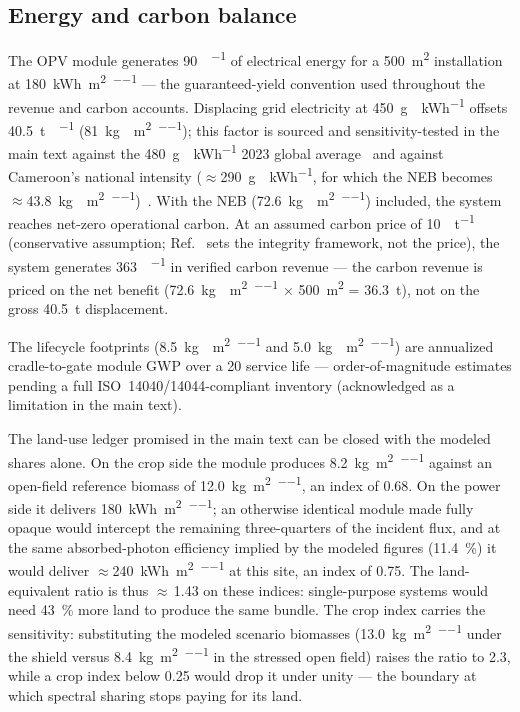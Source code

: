 \documentclass[11pt,a4paper]{article}
\begin{document}
\subsection{Energy and carbon balance}

The OPV module generates \qty{90}{\MWh\per\yr} of electrical energy for a \qty{500}{\m\squared} installation at \qty{180}{\kWh\per\m\squared\per\yr} --- the guaranteed-yield convention used throughout the revenue and carbon accounts. Displacing grid electricity at \qty{450}{\g{}\per\kWh} offsets \qty{40.5}{\tonne{}\per\yr} (\qty{81}{\kg{}\per\m\squared\per\yr}); this factor is sourced and sensitivity-tested in the main text against the \qty{480}{\g{}\per\kWh} 2023 global average~\cite{Ember2024} and against Cameroon's national intensity ($\approx$\qty{290}{\g{}\per\kWh}, for which the NEB becomes $\approx$\qty{43.8}{\kg{}\per\m\squared\per\yr})~\cite{ClimateAnalytics2024}. With the NEB (\qty{72.6}{\kg{}\per\m\squared\per\yr}) included, the system reaches net-zero operational carbon. At an assumed carbon price of \qty{10}{\USD\per\tonne{}} (conservative assumption; Ref.~\cite{ICVCM2024} sets the integrity framework, not the price), the system generates \qty{363}{\USD\per\yr} in verified carbon revenue --- the carbon revenue is priced on the net benefit (\qty{72.6}{\kg{}\per\m\squared\per\yr} $\times$ \qty{500}{\m\squared} = \qty{36.3}{\tonne}), not on the gross \qty{40.5}{\tonne} displacement.

The lifecycle footprints (\qty{8.5}{\kg{}\per\m\squared\per\yr} and \qty{5.0}{\kg{}\per\m\squared\per\yr}) are annualized cradle-to-gate module GWP over a \qty{20}{\yr} service life --- order-of-magnitude estimates pending a full ISO~14040/14044-compliant inventory (acknowledged as a limitation in the main text).

The land-use ledger promised in the main text can be closed with the modeled shares alone. On the crop side the module produces \qty{8.2}{\kg\per\m\squared\per\yr} against an open-field reference biomass of \qty{12.0}{\kg\per\m\squared\per\yr}, an index of \num{0.68}. On the power side it delivers \qty{180}{\kWh\per\m\squared\per\yr}; an otherwise identical module made fully opaque would intercept the remaining three-quarters of the incident flux, and at the same absorbed-photon efficiency implied by the modeled figures (\qty{11.4}{\percent}) it would deliver $\approx$\qty{240}{\kWh\per\m\squared\per\yr} at this site, an index of \num{0.75}. The land-equivalent ratio is thus $\approx$\,\num{1.43} on these indices: single-purpose systems would need \qty{43}{\percent} more land to produce the same bundle. The crop index carries the sensitivity: substituting the modeled scenario biomasses (\qty{13.0}{\kg\per\m\squared\per\yr} under the shield versus \qty{8.4}{\kg\per\m\squared\per\yr} in the stressed open field) raises the ratio to \num{2.3}, while a crop index below \num{0.25} would drop it under unity --- the boundary at which spectral sharing stops paying for its land.
\end{document}
